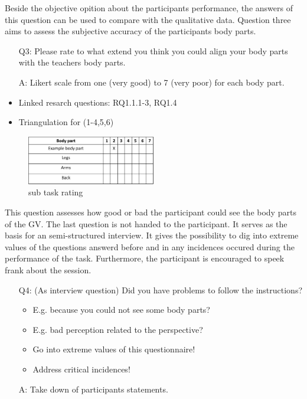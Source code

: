 Beside the objective opition about the participants performance, the answers of this question can be used to compare with the qualitative data. Question three aims to assess the subjective accuracy of the participants body parts.
\begin{itemize}
	\item[Q3:] Please rate to what extend you think you could align your body parts with the teachers body parts. 
	\item[A:] Likert scale from one (very good) to 7 (very poor) for each body part.
	\item Linked resarch questions: RQ1.1.1-3, RQ1.4
	\item Triangulation for (1-4,5,6)
\end{itemize} 
\begin{figure}[H]
	\centering
	\includegraphics[width=0.5\textwidth]{figures/body-parts-acc.png}
	\caption[sub task rating]{sub task rating}
	\label{fig:bodypartsacc}
\end{figure}
This question assesses how good or bad the participant could see the body parts of the GV. The last question is not handed to the participant. It serves as the basis for an semi-structured interview. It gives the possibility to dig into extreme values of the questions answerd before and in any incidences occured during the performance of the task. Furthermore, the participant is encouraged to speek frank about the session. 
\begin{itemize}
	\item[Q4:] (As interview question) Did you have problems to follow the instructions? 
	\begin{itemize}
		\item E.g. because you could not see some body parts?
		\item E.g. bad perception related to the perspective?
		\item Go into extreme values of this questionnaire! 
		\item Address critical incidences!
	\end{itemize}
	\item[A:] Take down of participants statements.
\end{itemize}

